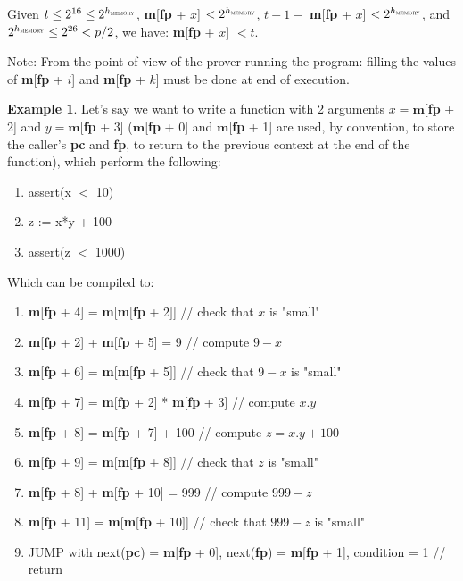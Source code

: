 \documentclass{article}
\theoremstyle{definition}
\newtheorem{exmp}{Example}[section]
\begin{document}
Given $t \leq 2^{16} \leq 2^{h_\textsc{memory}}$, \textbf{m}[\textbf{fp} + $x$] $< 2^{h_\textsc{memory}}$, $t - 1 - $ \textbf{m}[\textbf{fp} + $x$] $< 2^{h_\textsc{memory}}$, and $2^{h_\textsc{memory}} \leq 2^{26} < p / 2$, we have: \textbf{m}[\textbf{fp} + $x$] $ < t$.

Note: From the point of view of the prover running the program: filling the values of \textbf{m}[\textbf{fp} + $i$] and \textbf{m}[\textbf{fp} + $k$] must be done at end of execution.


\begin{exmp}
	Let's say we want to write a function with 2 arguments $x = \textbf{m}$[\textbf{fp} + 2] and $y = \textbf{m}$[\textbf{fp} + 3] ($\textbf{m}$[\textbf{fp} + 0] and $\textbf{m}$[\textbf{fp} + 1] are used, by convention, to store the caller's \textbf{pc} and \textbf{fp}, to return to the previous context at the end of the function), which perform the following:
	
	\begin{enumerate}
		\item assert(x $<$ 10)
		\item z := x*y + 100
		\item assert(z $<$ 1000)
	\end{enumerate}
	
	Which can be compiled to:
	
	\begin{enumerate}
		\item \textbf{m}[\textbf{fp} + 4] = \textbf{m}[\textbf{m}$\big[$\textbf{fp} + 2$\big]$] // check that $x$ is "small"
		\item \textbf{m}[\textbf{fp} + 2] + \textbf{m}[\textbf{fp} + 5] = 9 // compute $9 - x$
		\item \textbf{m}[\textbf{fp} + 6] = \textbf{m}[\textbf{m}$\big[$\textbf{fp} + 5$\big]$] // check that $9 - x$ is "small"
		\item \textbf{m}[\textbf{fp} + 7] = \textbf{m}[\textbf{fp} + 2] * \textbf{m}[\textbf{fp} + 3] // compute $x.y$
		\item \textbf{m}[\textbf{fp} + 8] = \textbf{m}[\textbf{fp} + 7] + 100 // compute $z = x.y + 100$
		\item \textbf{m}[\textbf{fp} + 9] = \textbf{m}[\textbf{m}$\big[$\textbf{fp} + 8$\big]$] // check that $z$ is "small"
		\item \textbf{m}[\textbf{fp} + 8] + \textbf{m}[\textbf{fp} + 10] = 999 // compute $999 - z$
		\item \textbf{m}[\textbf{fp} + 11] = \textbf{m}[\textbf{m}$\big[$\textbf{fp} + 10$\big]$] // check that $999 - z$ is "small"
		\item JUMP with next(\textbf{pc}) = \textbf{m}[\textbf{fp} + 0], next(\textbf{fp}) = \textbf{m}[\textbf{fp} + 1], condition = 1 // return
	\end{enumerate}
	
	 
\end{exmp}
\end{document}
